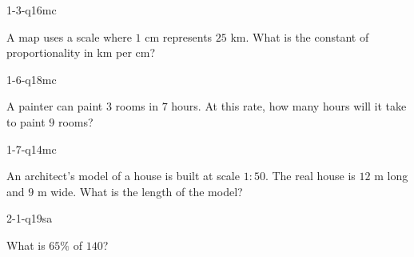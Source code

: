 
\begin{practiceQuestion}{1-3-q16}{mc}
\begin{questionText}
A map uses a scale where $1$ cm represents $25$ km. What is the constant of proportionality in km per cm?
\end{questionText}
\end{practiceQuestion}

\begin{practiceQuestion}{1-6-q18}{mc}
\begin{questionText}
A painter can paint $3$ rooms in $7$ hours. At this rate, how many hours will it take to paint $9$ rooms?
\end{questionText}
\end{practiceQuestion}

\begin{practiceQuestion}{1-7-q14}{mc}
\begin{questionText}
An architect's model of a house is built at scale $1 : 50$. The real house is $12$ m long and $9$ m wide. What is the length of the model?
\end{questionText}
\end{practiceQuestion}

\begin{practiceQuestion}{2-1-q19}{sa}
\begin{questionText}
What is $65\%$ of $140$?
\end{questionText}
\end{practiceQuestion}

